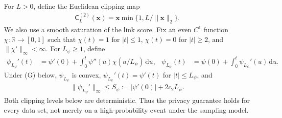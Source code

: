 \documentclass[letterpaper,12pt]{article}
\renewcommand{\d}{\mathrm{d}}
\numberwithin{equation}{section}
\theoremstyle{plain}
\numberwithin{Theorem}{section}
\numberwithin{proposition}{section}
\numberwithin{Lemma}{section}
{
	\theoremstyle{definition}
	\newtheorem{Definition}{Definition}
	\newtheorem{example}{Example}
	\numberwithin{example}{section}
	\newtheorem{fact}{Fact}
	\numberwithin{fact}{section}
	\newtheorem{remark}{Remark}
}
\newcommand{\1}{\mathbbm{1}}
\begin{document}
For $L>0$, define the Euclidean clipping map
\begin{align*}
	\mathsf C_L^{(2)}(\bm x)=\bm x\min\{1,L/\|\bm x\|_2\}.
\end{align*}
We also use a smooth saturation of the link score.  Fix an even
$C^1$ function $\chi:\mathbb R\to[0,1]$ such that
$\chi(t)=1$ for $|t|\leq1$, $\chi(t)=0$ for $|t|\geq2$, and
$\|\chi'\|_\infty<\infty$.  For $L_\psi\geq1$, define
\begin{align}
	\psi_{L_\psi}'(t)
	&=\psi'(0)+\int_0^t\psi''(u)\chi(u/L_\psi)\,\d u,
	&
	\psi_{L_\psi}(t)
	&=\psi(0)+\int_0^t\psi_{L_\psi}'(u)\,\d u.       \label{eq: saturated link score}
\end{align}
Under (G) below, $\psi_{L_\psi}$ is convex,
$\psi_{L_\psi}'(t)=\psi'(t)$ for $|t|\leq L_\psi$, and
\begin{align}
	\|\psi_{L_\psi}'\|_\infty
	\leq S_\psi:=|\psi'(0)|+2c_2L_\psi.              \label{eq: saturated score bound}
\end{align}
Both clipping levels below are deterministic. Thus the privacy guarantee
holds for every data set, not merely on a high-probability event under
the sampling model.
\end{document}
